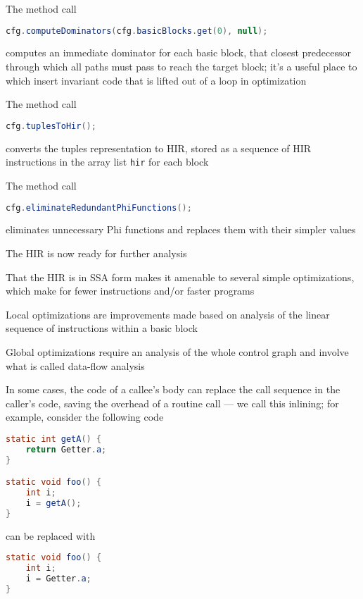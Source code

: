 \documentclass[8pt,a4paper,compress]{beamer}
\begin{document}
\begin{frame}[fragile]
\pause

The method call
\begin{lstlisting}[language=Java]
cfg.computeDominators(cfg.basicBlocks.get(0), null);
\end{lstlisting}
computes an immediate dominator for each basic block, that closest predecessor through which all paths must pass to reach the target block; it's a useful place to which insert invariant code that is lifted out of a loop in optimization

\pause
\bigskip

The method call
\begin{lstlisting}[language=Java]
cfg.tuplesToHir();
\end{lstlisting}
converts the tuples representation to HIR, stored as a sequence of HIR instructions in the array list \lstinline{hir} for each block

\pause
\bigskip

The method call
\begin{lstlisting}[language=Java]
cfg.eliminateRedundantPhiFunctions();
\end{lstlisting}
eliminates unnecessary Phi functions and replaces them with their simpler values

\pause
\bigskip

The HIR is now ready for further analysis
\end{frame}

\begin{frame}[fragile]
\pause

That the HIR is in SSA form makes it amenable to several simple optimizations, which make for fewer instructions and/or faster programs

\pause
\bigskip

Local optimizations are improvements made based on analysis of the linear sequence of instructions within a basic block

\pause
\bigskip

Global optimizations require an analysis of the whole control graph and involve what is called data-flow analysis

\pause
\bigskip

In some cases, the code of a callee's body can replace the call sequence in the caller's code, saving the overhead of a routine call --- we call this inlining; for example, consider the following code

\begin{lstlisting}[language=Java]
static int getA() {
    return Getter.a;
}

static void foo() {
    int i;
    i = getA();
}
\end{lstlisting}

can be replaced with

\begin{lstlisting}[language=Java]
static void foo() {
    int i;
    i = Getter.a;
}
\end{lstlisting}
\end{frame}
\end{document}
